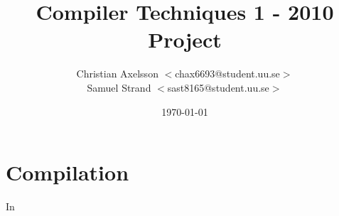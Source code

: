 \documentclass[a4paper]{article}
\title{Compiler Techniques 1 - 2010\\Project}
\author{Christian Axelsson $<$chax6693@student.uu.se$>$\\Samuel Strand
$<$sast8165@student.uu.se$>$}
\date{\today}
\begin{document}
\maketitle

\section{Compilation}
In 
\end{document}
